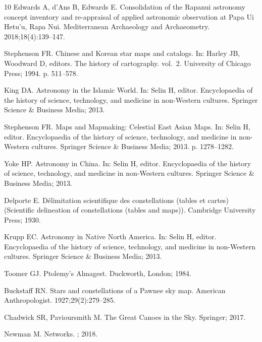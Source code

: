 \documentclass[10pt]{article}
\begin{document}
{\begin{thebibliography}{10}
Edwards A, d’Ans B, Edwards E.
\newblock Consolidation of the {Rapanui} astronomy concept inventory and
  re-appraisal of applied astronomic observation at {Papa Ui Hetu’u, Rapa
  Nui}.
\newblock Mediterranean Archaeology and Archaeometry. 2018;18(4):139--147.

Stephenson FR.
\newblock Chinese and {Korean} star maps and catalogs.
\newblock In: Harley JB, Woodward D, editors. The history of cartography.
  vol.~2. University of Chicago Press; 1994. p. 511--578.

King DA.
\newblock Astronomy in the {Islamic} World.
\newblock In: Selin H, editor. Encyclopaedia of the history of science,
  technology, and medicine in non-{W}estern cultures. Springer Science \&
  Business Media; 2013.

Stephenson FR.
\newblock Maps and Mapmaking: Celestial {East Asian} Maps.
\newblock In: Selin H, editor. Encyclopaedia of the history of science,
  technology, and medicine in non-{W}estern cultures. Springer Science \&
  Business Media; 2013. p. 1278--1282.

Yoke HP.
\newblock Astronomy in {China}.
\newblock In: Selin H, editor. Encyclopaedia of the history of science,
  technology, and medicine in non-{W}estern cultures. Springer Science \&
  Business Media; 2013.

Delporte E.
\newblock D{\'e}limitation scientifique des constellations (tables et cartes)
  ({S}cientific delineation of constellations (tables and maps)).
\newblock Cambridge University Press; 1930.

Krupp EC.
\newblock Astronomy in {Native North America}.
\newblock In: Selin H, editor. Encyclopaedia of the history of science,
  technology, and medicine in non-{W}estern cultures. Springer Science \&
  Business Media; 2013.

Toomer GJ.
\newblock Ptolemy's {A}lmagest.
\newblock Duckworth, London; 1984.

Buckstaff RN.
\newblock Stars and constellations of a {Pawnee} sky map.
\newblock American Anthropologist. 1927;29(2):279--285.

Chadwick SR, Pavioursmith M.
\newblock The Great Canoes in the Sky.
\newblock Springer; 2017.

Newman M.
\newblock Networks.
; 2018.


\end{thebibliography}}
\end{document}
